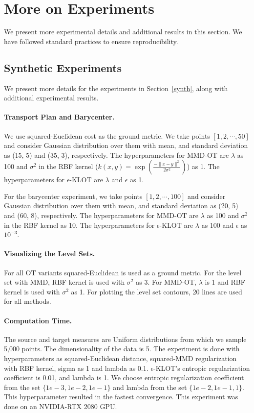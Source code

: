 \resumetoc
\section{More on Experiments}\label{uot-app:exp}
\stoptoc

We present more experimental details and additional results in this section. We have followed standard practices to ensure reproducibility.

\subsection{Synthetic Experiments}\label{appendix:synth}
We present more details for the experiments in Section~\ref{synth}, along with additional experimental results.
\paragraph{Transport Plan and Barycenter.}
We use squared-Euclidean cost as the ground metric. We take points $[1, 2, \cdots, 50]$ and consider Gaussian distribution over them with mean, and standard deviation as (15, 5) and (35, 3), respectively. The hyperparameters for MMD-OT are $\lambda$ as 100 and $\sigma^2$ in the RBF kernel ($k(x, y) = \exp{\left(\frac{-\|x-y\|^2}{2\sigma^2}\right)}$) as 1. The hyperparameters for $\epsilon$-KLOT are $\lambda$ and $\epsilon$ as 1.

For the barycenter experiment, we take points $[1, 2, \cdots, 100]$ and consider Gaussian distribution over them with mean, and standard deviation as (20, 5) and (60, 8), respectively. The hyperparameters for MMD-OT are $\lambda$ as 100 and $\sigma^2$ in the RBF kernel as 10. The hyperparameters for $\epsilon$-KLOT are $\lambda$ as 100 and $\epsilon$ as $10^{-3}$.
\paragraph{Visualizing the Level Sets.} 
For all OT variants squared-Euclidean is used as a ground metric. For the level set with MMD, RBF kernel is used with $\sigma^2$ as 3. For MMD-OT, $\lambda$ is 1 and RBF kernel is used with $\sigma^2$ as 1. For plotting the level set contours, 20 lines are used for all methods.
\paragraph{Computation Time.}
The source and target measures are Uniform distributions from which we sample 5,000 points. The dimensionality of the data is 5. The experiment is done with hyperparameters as squared-Euclidean distance, squared-MMD regularization with RBF kernel, sigma as 1 and lambda as 0.1. $\epsilon$-KLOT's entropic regularization coefficient is 0.01, and lambda is 1. We choose entropic regularization coefficient from the set $\{1e-3, 1e-2, 1e-1\}$ and lambda from the set $\{1e-2, 1e-1, 1\}$. This hyperparameter resulted in the fastest convergence. This experiment was done on an NVIDIA-RTX 2080 GPU.


